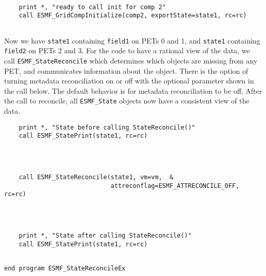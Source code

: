 
 \begin{verbatim}

    print *, "ready to call init for comp 2"
    call ESMF_GridCompInitialize(comp2, exportState=state1, rc=rc)
 
\end{verbatim}
 

     
   Now we have {\tt state1} containing {\tt field1} on PETs 0 and 1, and
   {\tt state1} containing {\tt field2} on PETs 2 and 3.  For the code
   to have a rational view of the data, we call {\tt ESMF\_StateReconcile}
   which determines which objects are missing from any PET, and communicates
   information about the object.  There is the option of turning metadata
   reconciliation on or off with the optional parameter shown in the call 
   below.  The default behavior is for metadata reconciliation to be off.
   After the call to reconcile, all
   {\tt ESMF\_State} objects now have a consistent view of the data. 

 \begin{verbatim}
    print *, "State before calling StateReconcile()"
    call ESMF_StatePrint(state1, rc=rc)
 
\end{verbatim}
 

 \begin{verbatim}


    call ESMF_StateReconcile(state1, vm=vm,  &
                             attreconflag=ESMF_ATTRECONCILE_OFF, rc=rc)
 
\end{verbatim}
 

 \begin{verbatim}


    print *, "State after calling StateReconcile()"
    call ESMF_StatePrint(state1, rc=rc)
 
\end{verbatim}
 

 \begin{verbatim}
end program ESMF_StateReconcileEx
 
\end{verbatim}

\setlength{\parskip}{\oldparskip}
\setlength{\parindent}{\oldparindent}
\setlength{\baselineskip}{\oldbaselineskip}
